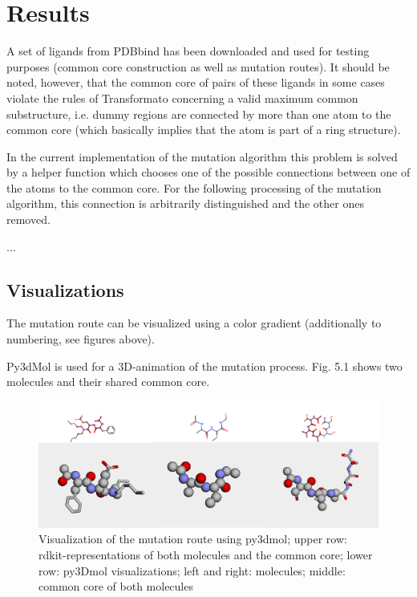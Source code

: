 \chapter{Results}

A set of ligands from PDBbind has been downloaded and used for testing
purposes (common core construction as well as mutation routes). It
should be noted, however, that the common core of pairs of these ligands
in some cases violate the rules of Transformato concerning a valid
maximum common substructure, i.e. dummy regions are connected by more
than one atom to the common core (which basically implies that the
atom is part of a ring structure). 

In the current implementation of the mutation algorithm this problem
is solved by a helper function which chooses one of the possible connections
between one of the atoms to the common core. For the following processing
of the mutation algorithm, this connection is arbitrarily distinguished
and the other ones removed. 

...

\section{Visualizations}

The mutation route can be visualized using a color gradient (additionally
to numbering, see figures above).

Py3dMol is used for a 3D-animation of the mutation process. Fig. 5.1
shows two molecules and their shared common core.

\begin{figure}
\includegraphics{trafo_py3d_1verkleinert}

\caption{Visualization of the mutation route using py3dmol; upper row: rdkit-representations
of both molecules and the common core; lower row: py3Dmol visualizations;
left and right: molecules; middle: common core of both molecules}

\end{figure}


